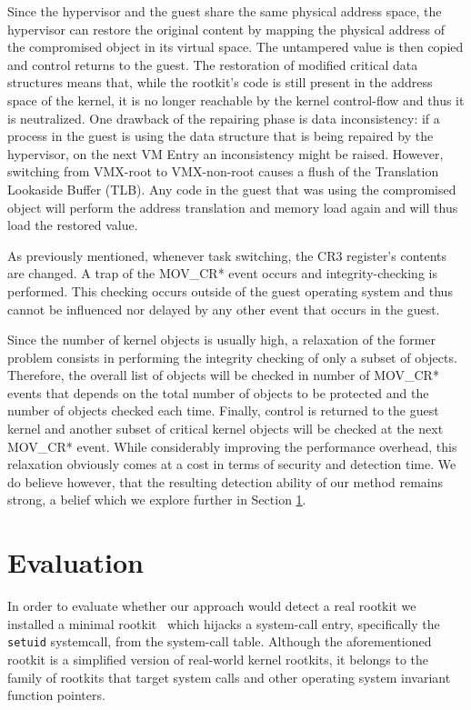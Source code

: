 Since the hypervisor and the guest share the same physical address space, the hypervisor can restore the original content by mapping the physical address of the compromised object in its virtual space. The untampered value is then copied and control returns to the guest. The restoration of modified critical data structures means that, while the rootkit's code is still present in the address space of the kernel, it is no longer reachable by the kernel control-flow and thus it is neutralized. 
One drawback of the repairing phase is data inconsistency: if a process in the guest is using the data structure that is being repaired by the hypervisor, on the next VM Entry an inconsistency might be raised. However, switching from VMX-root to VMX-non-root causes a flush of the Translation Lookaside Buffer (TLB). Any code in the guest that was using the compromised object will perform the address translation and memory load again and will thus load the restored value.

As previously mentioned, whenever task switching, the CR3 register's contents are changed. A trap of the MOV\_CR* event occurs and integrity-checking is performed. This checking occurs outside of the guest operating system and thus cannot be influenced nor delayed by any other event that occurs in the guest.

Since the number of kernel objects is usually high, a relaxation of the former problem consists in performing the integrity checking of only a subset of objects. 
Therefore, the overall list of objects will be checked in number of MOV\_CR* events that depends on the total number of objects to be protected and the number of objects checked each time. 
Finally, control is returned to the guest kernel and another subset of critical kernel objects will be checked at the next MOV\_CR* event. While considerably improving the performance overhead, this relaxation obviously comes at a cost in terms of security and detection time. We do believe however, that the resulting detection ability of our method remains strong, a belief which we explore further in Section \ref{hr:evaluation}.


\section{Evaluation}\label{hr:evaluation}

In order to evaluate whether our approach would detect a real rootkit we installed a minimal rootkit~\cite{kernel_hijack} which hijacks a system-call entry, specifically the \texttt{setuid} systemcall, from the system-call table. Although the aforementioned rootkit is a simplified version of real-world kernel rootkits, it belongs to the family of rootkits that target system calls and other operating system invariant function pointers. 


